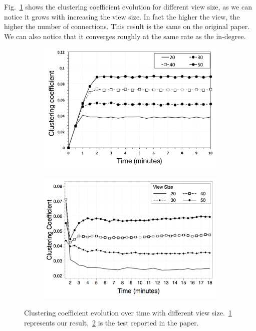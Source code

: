 Fig.~\ref{fig:clustering_coefficient_evolution} shows the clustering coefficient evolution for different view size, as we can notice it grows with increasing the view size. In fact the higher the view, the higher the number of connections. This result is the same on the original paper. We can also notice that it converges roughly at the same rate as the in-degree.

\begin{figure}
\centering
\begin{subfigure}{.5\textwidth}
  \centering
  \includegraphics[keepaspectratio=true, width=1\linewidth]{images/clustering_coefficient_evolution}
  \caption{}
  \label{fig:clustering_coefficient_evolution}
\end{subfigure}%
\begin{subfigure}{.5\textwidth}
  \centering
  \includegraphics[keepaspectratio=true, width=1\linewidth]{images/paper_clustering_coefficient_evolution}
  \caption{}
  \label{fig:paper_clustering_coefficient_evolution}
\end{subfigure}
\caption{Clustering coefficient evolution over time with different view size.~\ref{fig:clustering_coefficient_evolution} represents our result,~\ref{fig:paper_clustering_coefficient_evolution} is the test reported in the paper.}
\label{fig:randomness_clustering}
\end{figure}


